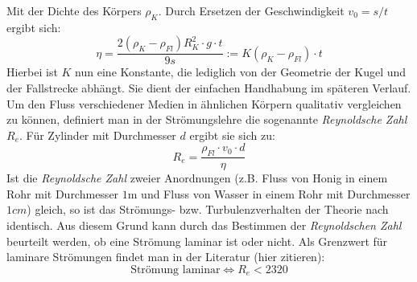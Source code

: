 Mit der Dichte des Körpers $\rho_K$. Durch Ersetzen der Geschwindigkeit $v_0 = s / t$ ergibt sich:
\begin{equation}
  \eta = \frac{2 (\rho_K - \rho_{Fl}) R_K^2 \cdot  g \cdot t}{9  s} := K (\rho_K - \rho_{Fl}) \cdot t
  \label{eq: eta}
\end{equation}
Hierbei ist $K$ nun eine Konstante, die lediglich von der Geometrie der Kugel und der Fallstrecke abhängt. Sie dient der einfachen Handhabung im späteren Verlauf.\\

Um den Fluss verschiedener Medien in ähnlichen Körpern qualitativ vergleichen zu können, definiert man in der Strömungslehre die sogenannte \emph{Reynoldsche Zahl} $R_e$. Für
Zylinder mit Durchmesser $d$ ergibt sie sich zu:
\begin{equation}
  R_e = \frac{\rho_{Fl} \cdot v_0 \cdot d}{\eta}
  \label{eq: reynolds}
\end{equation}
Ist die \emph{Reynoldsche Zahl} zweier Anordnungen (z.B. Fluss von Honig in einem Rohr mit Durchmesser $1 \si{\meter}$ und Fluss von Wasser in einem Rohr mit Durchmesser $1\si{cm}$) gleich, so
ist das Strömungs- bzw. Turbulenzverhalten der Theorie nach identisch. Aus diesem Grund kann durch das Bestimmen der \emph{Reynoldschen Zahl} beurteilt werden, ob eine Strömung laminar ist oder nicht.
Als Grenzwert für laminare Strömungen findet man in der Literatur (hier zitieren):
\begin{equation}
  \text{Strömung laminar} \Leftrightarrow R_e < 2320
  \label{eq: laminar}
\end{equation}
